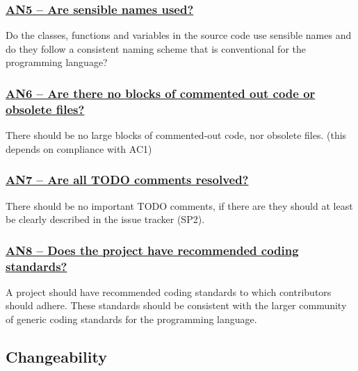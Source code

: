 \documentclass[a4paper,11pt]{article}
\newcommand{\indicator}[1]{\subsubsection*{\underline{#1}}}
\begin{document}
\indicator{AN5 -- Are sensible names used?}

Do the classes, functions and variables in the source code use sensible names
and do they follow a consistent naming scheme that is conventional for the
programming language?

\indicator{AN6 -- Are there no blocks of commented out code or obsolete files?}

There should be no large blocks of commented-out code, nor obsolete files.
(this depends on compliance with AC1)

\indicator{AN7 -- Are all TODO comments resolved?}

There should be no important TODO comments, if there are they should at least be
clearly described in the issue tracker (SP2).

\indicator{AN8 -- Does the project have recommended coding standards?}

A project should have recommended coding standards to which contributors
should adhere. These standards should be consistent with the larger community
of generic coding standards for the programming language.

\subsection{Changeability}
%
%
%
\end{document}
